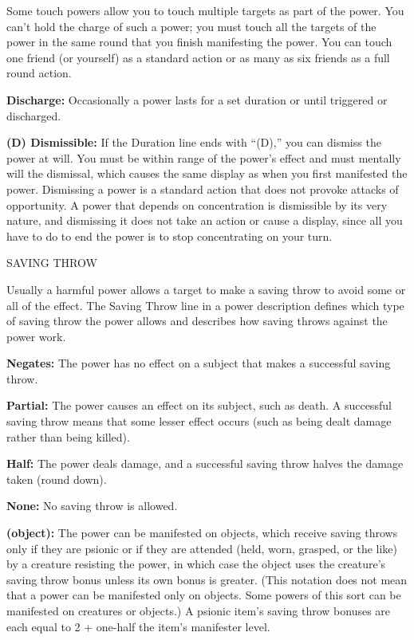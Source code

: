 \documentclass{article}
\begin{document}
Some touch powers\textit{ }allow you to touch multiple targets as part of the power. 
You can't hold the charge of such a power; you must touch all the targets of the 
power in the same round that you finish manifesting the power. You can touch one 
friend (or yourself) as a standard action or as many as six friends as a full round 
action.

\textbf{Discharge: }Occasionally a power lasts for a set duration or until triggered 
or discharged.

\textbf{(D) Dismissible:} If the Duration line ends with ``(D),'' you can dismiss 
the power at will. You must be within range of the power's effect and must mentally 
will the dismissal, which causes the same display as when you first manifested 
the power. Dismissing a power is a standard action that does not provoke attacks 
of opportunity. A power that depends on concentration is dismissible by its very 
nature, and dismissing it does not take an action or cause a display, since all 
you have to do to end the power is to stop concentrating on your turn.

\vspace{12pt}
SAVING THROW

Usually a harmful power allows a target to make a saving throw to avoid some or 
all of the effect. The Saving Throw line in a power description defines which type 
of saving throw the power allows and describes how saving throws against the power 
work.

\textbf{Negates:} The power has no effect on a subject that makes a successful 
saving throw.

\textbf{Partial:} The power causes an effect on its subject, such as death. A successful 
saving throw means that some lesser effect occurs (such as being dealt damage rather 
than being killed).

\textbf{Half:} The power deals damage, and a successful saving throw halves the 
damage taken (round down). 

\textbf{None: }No saving throw is allowed.

\textbf{(object):} The power can be manifested on objects, which receive saving 
throws only if they are psionic or if they are attended (held, worn, grasped, or 
the like) by a creature resisting the power, in which case the object uses the 
creature's saving throw bonus unless its own bonus is greater. (This notation does 
not mean that a power can be manifested only on objects. Some powers of this sort 
can be manifested on creatures or objects.) A psionic item's saving throw bonuses 
are each equal to 2 + one-half the item's manifester level.
\end{document}
